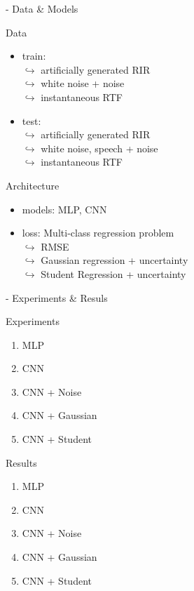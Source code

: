 \begin{frame}{\lantern - Data \& Models}
    \begin{block}{Data}
        \begin{itemize}
            \item train:
            \\$\hookrightarrow$ artificially generated RIR
            \\$\hookrightarrow$ white noise + noise
            \\$\hookrightarrow$ instantaneous RTF
            \item test:
            \\$\hookrightarrow$ artificially generated RIR
            \\$\hookrightarrow$ white noise, speech + noise
            \\$\hookrightarrow$ instantaneous RTF
        \end{itemize}
    \end{block}

    \begin{block}{Architecture}
        \begin{itemize}
            \item models: MLP, CNN
            \item loss: Multi-class regression problem
            \\$\hookrightarrow$ RMSE
            \\$\hookrightarrow$ Gaussian regression + uncertainty
            \\$\hookrightarrow$ Student Regression + uncertainty
        \end{itemize}
    \end{block}

\end{frame}

\begin{frame}{\lantern - Experiments \& Resuls}
    \begin{block}{Experiments}
        \begin{enumerate}
            \item MLP
            \item CNN
            \item CNN + Noise
            \item CNN + Gaussian
            \item CNN + Student
        \end{enumerate}
    \end{block}

    \begin{block}{Results}
        \begin{enumerate}
            \item MLP
            \item CNN
            \item CNN + Noise
            \item CNN + Gaussian
            \item CNN + Student
        \end{enumerate}
    \end{block}

\end{frame}

